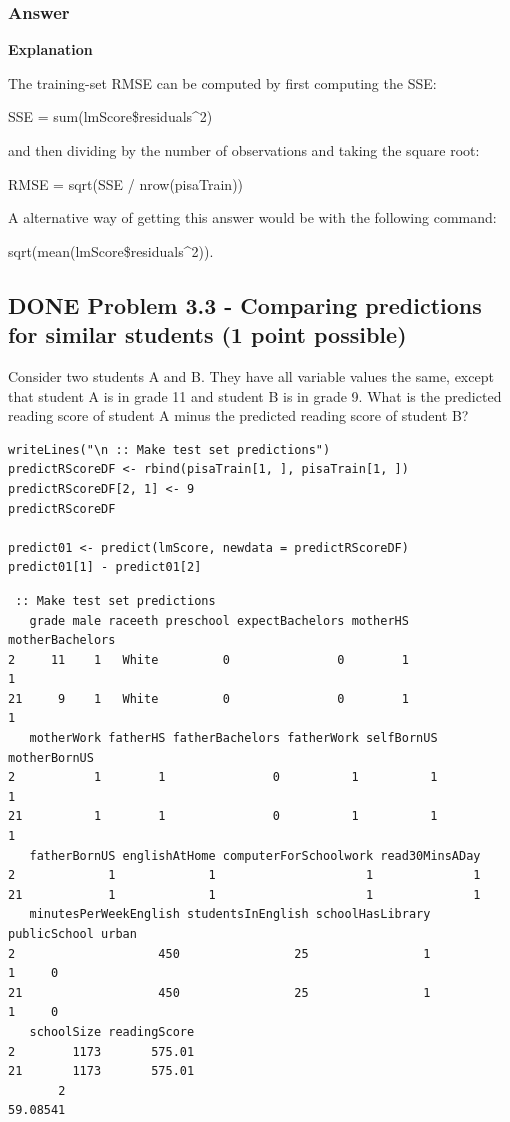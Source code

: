 \documentclass[letterpaper, 9pt, onecolumn, twoside, technote, final]{IEEEtran}
\begin{document}
\subsubsection{Answer}
\label{sec-2-9-1}

\textbf{Explanation}

The training-set RMSE can be computed by first computing the SSE:

SSE = sum(lmScore\$residuals\^{}2)

and then dividing by the number of observations and taking the square
root:

RMSE = sqrt(SSE / nrow(pisaTrain))

A alternative way of getting this answer would be with the following
command:

sqrt(mean(lmScore\$residuals\^{}2)).

\subsection{{\bfseries\sffamily DONE} Problem 3.3 - Comparing predictions for similar students (1 point possible)}
\label{sec-2-10}
Consider two students A and B. They have all variable values the same,
except that student A is in grade 11 and student B is in grade 9. What
is the predicted reading score of student A minus the predicted
reading score of student B?

\begin{verbatim}
writeLines("\n :: Make test set predictions")
predictRScoreDF <- rbind(pisaTrain[1, ], pisaTrain[1, ])
predictRScoreDF[2, 1] <- 9
predictRScoreDF

predict01 <- predict(lmScore, newdata = predictRScoreDF)
predict01[1] - predict01[2]
\end{verbatim}

\begin{verbatim}
 :: Make test set predictions
   grade male raceeth preschool expectBachelors motherHS motherBachelors
2     11    1   White         0               0        1               1
21     9    1   White         0               0        1               1
   motherWork fatherHS fatherBachelors fatherWork selfBornUS motherBornUS
2           1        1               0          1          1            1
21          1        1               0          1          1            1
   fatherBornUS englishAtHome computerForSchoolwork read30MinsADay
2             1             1                     1              1
21            1             1                     1              1
   minutesPerWeekEnglish studentsInEnglish schoolHasLibrary publicSchool urban
2                    450                25                1            1     0
21                   450                25                1            1     0
   schoolSize readingScore
2        1173       575.01
21       1173       575.01
       2
59.08541
\end{verbatim}
\end{document}
